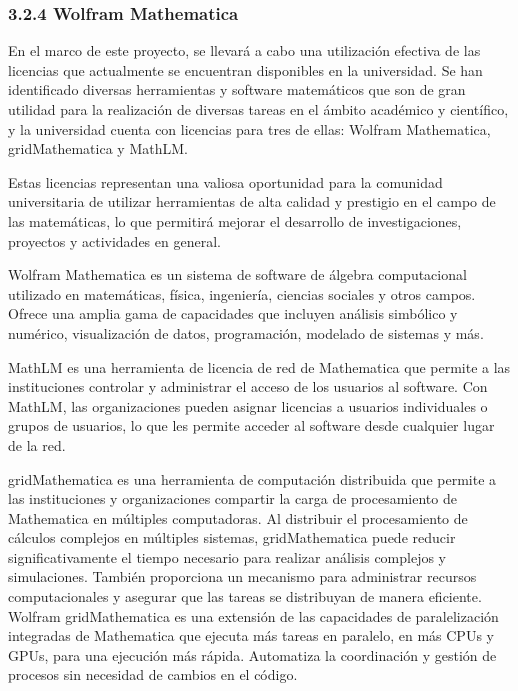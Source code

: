 \begin{spacing}{1.5}
    \subsubsection{3.2.4 Wolfram Mathematica}

    En el marco de este proyecto, se llevará a cabo una utilización efectiva de las licencias que actualmente se encuentran disponibles en la universidad. Se han identificado diversas herramientas y software matemáticos que son de gran utilidad para la realización de diversas tareas en el ámbito académico y científico, y la universidad cuenta con licencias para tres de ellas: Wolfram Mathematica, gridMathematica y MathLM.

    Estas licencias representan una valiosa oportunidad para la comunidad universitaria de utilizar herramientas de alta calidad y prestigio en el campo de las matemáticas, lo que permitirá mejorar el desarrollo de investigaciones, proyectos y actividades en general.
    
    Wolfram Mathematica es un sistema de software de álgebra computacional utilizado en matemáticas, física, ingeniería, ciencias sociales y otros campos. Ofrece una amplia gama de capacidades que incluyen análisis simbólico y numérico, visualización de datos, programación, modelado de sistemas y más. \cite{Wolfram-mathematica-1}
    
    MathLM es una herramienta de licencia de red de Mathematica que permite a las instituciones controlar y administrar el acceso de los usuarios al software. Con MathLM, las organizaciones pueden asignar licencias a usuarios individuales o grupos de usuarios, lo que les permite acceder al software desde cualquier lugar de la red. \cite{Wolfram-mathlm-1}
    
    gridMathematica es una herramienta de computación distribuida que permite a las instituciones y organizaciones compartir la carga de procesamiento de Mathematica en múltiples computadoras. Al distribuir el procesamiento de cálculos complejos en múltiples sistemas, gridMathematica puede reducir significativamente el tiempo necesario para realizar análisis complejos y simulaciones. También proporciona un mecanismo para administrar recursos computacionales y asegurar que las tareas se distribuyan de manera eficiente. Wolfram gridMathematica es una extensión de las capacidades de paralelización integradas de Mathematica que ejecuta más tareas en paralelo, en más CPUs y GPUs, para una ejecución más rápida. Automatiza la coordinación y gestión de procesos sin necesidad de cambios en el código. \cite{Wolfram-grid-1}


\end{spacing}
